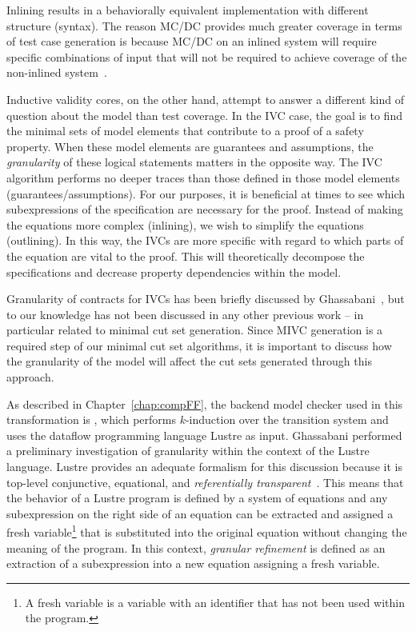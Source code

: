 Inlining results in a behaviorally equivalent implementation with different structure (syntax). The reason MC/DC provides much greater coverage in terms of test case generation is because MC/DC on an inlined system will require specific combinations of input that will not be required to achieve coverage of the non-inlined system~\cite{gay2016effect}. 

Inductive validity cores, on the other hand, attempt to answer a different kind of question about the model than test coverage. In the IVC case, the goal is to find the minimal sets of model elements that contribute to a proof of a safety property. When these model elements are guarantees and assumptions, the \emph{granularity} of these logical statements matters in the opposite way. The IVC algorithm performs no deeper traces than those defined in those model elements (guarantees/assumptions). For our purposes, it is beneficial at times to see which subexpressions of the specification are necessary for the proof. Instead of making the equations more complex (inlining), we wish to simplify the equations (outlining). In this way, the IVCs are more specific with regard to which parts of the equation are vital to the proof. This will theoretically decompose the specifications and decrease property dependencies within the model. 

Granularity of contracts for IVCs has been briefly discussed by Ghassabani~\cite{ghassabani_2018}, but to our knowledge has not been discussed in any other previous work -- in particular related to minimal cut set generation. Since MIVC generation is a required step of our minimal cut set algorithms, it is important to discuss how the granularity of the model will affect the cut sets generated through this approach. 

As described in Chapter~\ref{chap:compFF}, the backend model checker used in this transformation is \jkind, which performs $k$-induction over the transition system and uses the dataflow programming language Lustre as input. Ghassabani performed a preliminary investigation of granularity within the context of the Lustre language. Lustre provides an adequate formalism for this discussion because it is top-level conjunctive, equational, and \textit{referentially transparent}~\cite{Halbwachs91:IEEE}. This means that the behavior of a Lustre program is defined by a system of equations and any subexpression on the right side of an equation can be extracted and assigned a fresh variable\footnote{A fresh variable is a variable with an identifier that has not been used within the program.} that is substituted into the original equation without changing the meaning of the program. In this context, \textit{granular refinement} is defined as an extraction of a subexpression into a new equation assigning a fresh variable. 



